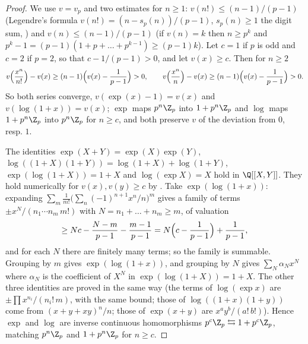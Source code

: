 \begin{proof}
We use $v=v_p$ and two estimates for $n\ge1$: $v(n!)\le(n-1)/(p-1)$ (Legendre's formula $v(n!)=(n-s_p(n))/(p-1)$, $s_p(n)\ge1$ the digit sum,
) and $v(n)\le(n-1)/(p-1)$ (if $v(n)=k$ then $n\ge p^k$ and $p^k-1=(p-1)(1+p+\dots+p^{k-1})\ge(p-1)k$). Let $c=1$ if $p$ is odd and $c=2$
if $p=2$, so that $c-1/(p-1)>0$, and let $v(x)\ge c$. Then for $n\ge2$
\[
v\Bigl(\frac{x^n}{n!}\Bigr)-v(x)\ge(n-1)\Bigl(v(x)-\frac1{p-1}\Bigr)>0,\qquad v\Bigl(\frac{x^n}n\Bigr)-v(x)\ge(n-1)\Bigl(v(x)-\frac1{p-1}\Bigr)>0 .
\]
So both series converge, $v(\exp(x)-1)=v(x)$ and $v(\log(1+x))=v(x)$; $\exp$ maps $p^n\Z_p$ into $1+p^n\Z_p$ and $\log$ maps $1+p^n\Z_p$ into
$p^n\Z_p$ for $n\ge c$, and both preserve $v$ of the deviation from $0$, resp. $1$.

The identities $\exp(X+Y)=\exp(X)\exp(Y)$, $\log((1+X)(1+Y))=\log(1+X)+\log(1+Y)$, $\exp(\log(1+X))=1+X$ and $\log(\exp X)=X$ hold in
$\Q[[X,Y]]$. They hold numerically for $v(x),v(y)\ge c$ by . Take $\exp(\log(1+x))$: expanding
$\sum_m\frac1{m!}\bigl(\sum_n(-1)^{n+1}x^n/n\bigr)^m$ gives a family of terms $\pm x^{N}/(n_1\cdots n_m\,m!)$ with $N=n_1+\dots+n_m\ge m$, of valuation
\[
\ge Nc-\frac{N-m}{p-1}-\frac{m-1}{p-1}=N\Bigl(c-\frac1{p-1}\Bigr)+\frac1{p-1},
\]
and for each $N$ there are finitely many terms; so the family is summable. Grouping by $m$ gives $\exp(\log(1+x))$, and grouping by $N$ gives
$\sum_N\alpha_Nx^N$ where $\alpha_N$ is the coefficient of $X^N$ in $\exp(\log(1+X))=1+X$. The other three identities are proved in the same way
(the terms of $\log(\exp x)$ are $\pm\prod x^{n_i}/(n_i!\,m)$, with the same bound; those of $\log((1+x)(1+y))$ come from $(x+y+xy)^n/n$; those of
$\exp(x+y)$ are $x^ay^b/(a!\,b!)$). Hence $\exp$ and $\log$ are inverse continuous homomorphisms $p^c\Z_p\leftrightarrows1+p^c\Z_p$, matching
$p^n\Z_p$ and $1+p^n\Z_p$ for $n\ge c$.


\end{proof}

